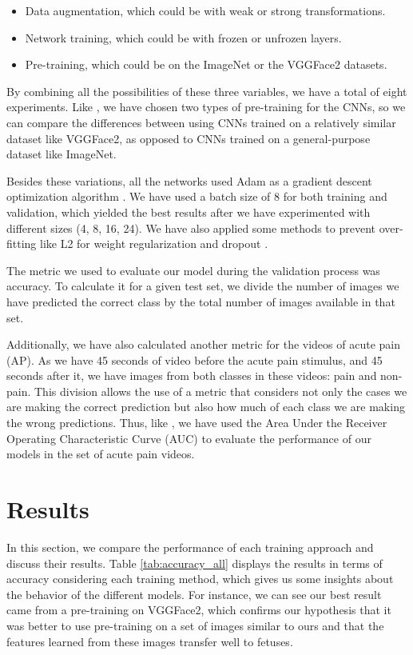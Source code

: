 \begin{itemize}
    \item Data augmentation, which could be with weak or strong transformations.
    
    \item Network training, which could be with frozen or unfrozen layers.
    
    \item Pre-training, which could be on the ImageNet or the VGGFace2 datasets.
\end{itemize}
By combining all the possibilities of these three variables, we have a total of eight experiments. Like \cite{abs-1807-01631}, we have chosen two types of pre-training for the CNNs, so we can compare the differences between using CNNs trained on a relatively similar dataset like VGGFace2, as opposed to CNNs trained on a general-purpose dataset like ImageNet.

Besides these variations, all the networks used Adam as a gradient descent optimization algorithm \citep{KingmaB14}. We have used a batch size of 8 for both training and validation, which yielded the best results after we have experimented with different sizes (4, 8, 16, 24). We have also applied some methods to prevent over-fitting like L2 for weight regularization \citep{Ng2004} and dropout \citep{SrivastavaHKSS14}.

The metric we used to evaluate our model during the validation process was accuracy. To calculate it for a given test set, we divide the number of images we have predicted the correct class by the total number of images available in that set.

Additionally, we have also calculated another metric for the videos of acute pain (AP). As we have 45 seconds of video before the acute pain stimulus, and 45 seconds after it, we have images from both classes in these videos: pain and non-pain.  This division allows the use of a metric that considers not only the cases we are making the correct prediction but also how much of each class we are making the wrong predictions. Thus, like \cite{abs-1807-01631}, we have used the Area Under the Receiver Operating Characteristic Curve (AUC) to evaluate the performance of our models in the set of acute pain videos.

\section{Results}

In this section, we compare the performance of each training approach and discuss their results. Table \ref{tab:accuracy_all} displays the results in terms of accuracy considering each training method, which gives us some insights about the behavior of the different models. For instance, we can see our best result came from a pre-training on VGGFace2, which confirms our hypothesis that it was better to use pre-training on a set of images similar to ours and that the features learned from these images transfer well to fetuses.

